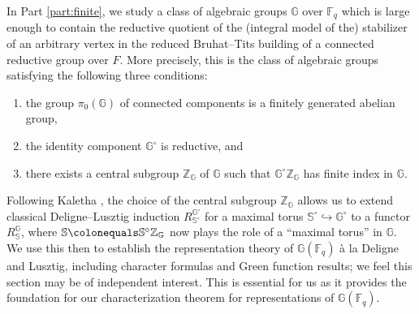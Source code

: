 \documentclass{amsart}
\newcommand{\F}{\mathbb{F}}
\newcommand{\FF}{\mathbb{F}}
\newcommand{\bbS}{\mathbb{S}}
\newcommand{\bbG}{\mathbb{G}}
\newcommand{\bbZ}{\mathbb{Z}}
\theoremstyle{plain}
\theoremstyle{definition}
\theoremstyle{remark}
\theoremstyle{theorem}
\begin{document}
In Part \ref{part:finite}, we study a class of algebraic groups $\bbG$ over $\F_{q}$ which is large enough to contain the reductive quotient of the (integral model of the) stabilizer of an arbitrary vertex in the reduced Bruhat--Tits building of a connected reductive group over $F$. 
More precisely, this is the class of algebraic groups satisfying the following three conditions: 
\begin{enumerate}[label=(\arabic*)]
    \item the group $\pi_0(\bbG)$ of connected components is a finitely generated abelian group, 
    \item the identity component $\bbG^\circ$ is reductive, and 
    \item there exists a central subgroup $\bbZ_{\bbG}$ of $\bbG$ such that $\bbG^\circ \bbZ_{\bbG}$ has finite index in $\bbG$.
\end{enumerate}
Following Kaletha \cite{Kal19-sc}, the choice of the central subgroup $\bbZ_{\bbG}$ allows us to extend classical Deligne--Lusztig induction $R_{\bbS^\circ}^{\bbG^\circ}$ for a maximal torus $\bbS^\circ \hookrightarrow \bbG^\circ$ to a functor $R_\bbS^\bbG$, where $\bbS \colonequals \bbS^\circ \bbZ_{\bbG}$ now plays the role of a ``maximal torus'' in $\bbG$.
We use this then to establish the representation theory of $\bbG(\FF_q)$ \`a la Deligne and Lusztig, including character formulas and Green function results; we feel this section may be of independent interest.
This is essential for us as it provides the foundation for our characterization theorem for representations of $\bbG(\FF_q)$.
\end{document}
